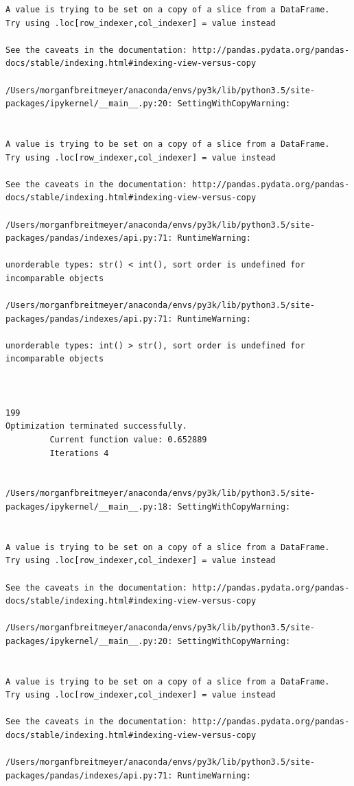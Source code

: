 \begin{lstlisting}
A value is trying to be set on a copy of a slice from a DataFrame.
Try using .loc[row_indexer,col_indexer] = value instead

See the caveats in the documentation: http://pandas.pydata.org/pandas-docs/stable/indexing.html#indexing-view-versus-copy

/Users/morganfbreitmeyer/anaconda/envs/py3k/lib/python3.5/site-packages/ipykernel/__main__.py:20: SettingWithCopyWarning:


A value is trying to be set on a copy of a slice from a DataFrame.
Try using .loc[row_indexer,col_indexer] = value instead

See the caveats in the documentation: http://pandas.pydata.org/pandas-docs/stable/indexing.html#indexing-view-versus-copy

/Users/morganfbreitmeyer/anaconda/envs/py3k/lib/python3.5/site-packages/pandas/indexes/api.py:71: RuntimeWarning:

unorderable types: str() < int(), sort order is undefined for incomparable objects

/Users/morganfbreitmeyer/anaconda/envs/py3k/lib/python3.5/site-packages/pandas/indexes/api.py:71: RuntimeWarning:

unorderable types: int() > str(), sort order is undefined for incomparable objects



199
Optimization terminated successfully.
         Current function value: 0.652889
         Iterations 4


/Users/morganfbreitmeyer/anaconda/envs/py3k/lib/python3.5/site-packages/ipykernel/__main__.py:18: SettingWithCopyWarning:


A value is trying to be set on a copy of a slice from a DataFrame.
Try using .loc[row_indexer,col_indexer] = value instead

See the caveats in the documentation: http://pandas.pydata.org/pandas-docs/stable/indexing.html#indexing-view-versus-copy

/Users/morganfbreitmeyer/anaconda/envs/py3k/lib/python3.5/site-packages/ipykernel/__main__.py:20: SettingWithCopyWarning:


A value is trying to be set on a copy of a slice from a DataFrame.
Try using .loc[row_indexer,col_indexer] = value instead

See the caveats in the documentation: http://pandas.pydata.org/pandas-docs/stable/indexing.html#indexing-view-versus-copy

/Users/morganfbreitmeyer/anaconda/envs/py3k/lib/python3.5/site-packages/pandas/indexes/api.py:71: RuntimeWarning:


\end{lstlisting}
